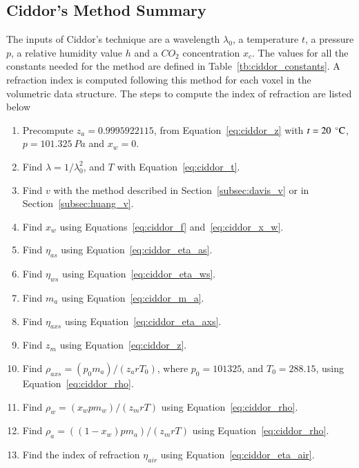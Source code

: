 \subsection{Ciddor's Method Summary}

The inputs of Ciddor's technique are a wavelength $\lambda_0$, a temperature $t$, a pressure $p$, a relative humidity value $h$ and a $CO_2$ concentration $x_c$.
The values for all the constants needed for the method are defined in Table~\ref{tb:ciddor_constants}.
A refraction index is computed following this method for each voxel in the volumetric data structure.
The steps to compute the index of refraction are listed below

\begin{enumerate}
\item Precompute $z_a = 0.9995922115$, from Equation~\ref{eq:ciddor_z} with $t = 20~\,^{\circ}{\rm C}$, $p = 101.325~Pa$ and $x_w=0$.
\item Find $\lambda = 1 / \lambda_0^2$, and $T$ with Equation~\ref{eq:ciddor_t}.
\item Find $v$ with the method described in Section~\ref{subsec:davis_v} or in Section~\ref{subsec:huang_v}.
\item Find $x_w$ using Equations~\ref{eq:ciddor_f} and~\ref{eq:ciddor_x_w}.
\item Find $\eta_{as}$ using Equation~\ref{eq:ciddor_eta_as}.
\item Find $\eta_{ws}$ using Equation~\ref{eq:ciddor_eta_ws}.
\item Find $m_a$ using Equation~\ref{eq:ciddor_m_a}.
\item Find $\eta_{axs}$ using Equation~\ref{eq:ciddor_eta_axs}.
\item Find $z_m$ using Equation~\ref{eq:ciddor_z}.
\item Find $\rho_{axs} = (p_0 m_a)/(z_a r T_0)$, where $p_0 = 101325$, and $T_0 = 288.15$, using Equation~\ref{eq:ciddor_rho}.
\item Find $\rho_{w} = (x_w p m_w)/(z_m r T)$ using Equation~\ref{eq:ciddor_rho}.
\item Find $\rho_{a} = ((1 - x_w) p m_a)/(z_m r T)$ using Equation~\ref{eq:ciddor_rho}.
\item Find the index of refraction $\eta_{air}$ using Equation~\ref{eq:ciddor_eta_air}.
\end{enumerate}

